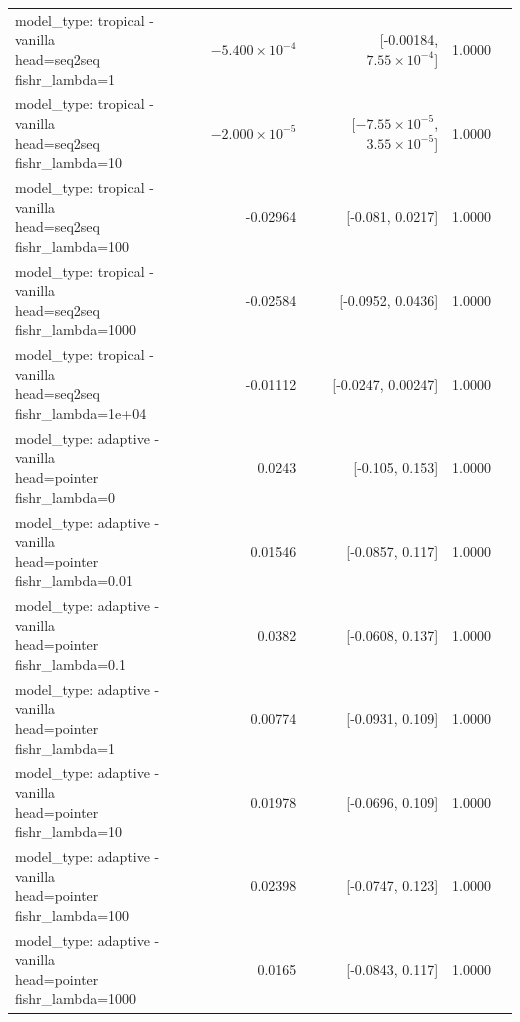 \documentclass[10pt]{article}
\makeatletter
\newcommand{\stackcell}[1]{\begin{tabular}[t]{@{}l@{}}#1\end{tabular}}
\makeatother
\begin{document}
{\begin{longtable}{lrrrl}
\stackcell{model\_type: tropical - vanilla\\\footnotesize head=seq2seq fishr\_lambda=1 } & $-5.400\times10^{-4}$ & [-0.00184, $7.55\times10^{-4}$] & 1.0000 & \\
\stackcell{model\_type: tropical - vanilla\\\footnotesize head=seq2seq fishr\_lambda=10 } & $-2.000\times10^{-5}$ & [$-7.55\times10^{-5}$, $3.55\times10^{-5}$] & 1.0000 & \\
\stackcell{model\_type: tropical - vanilla\\\footnotesize head=seq2seq fishr\_lambda=100 } & -0.02964 & [-0.081, 0.0217] & 1.0000 & \\
\stackcell{model\_type: tropical - vanilla\\\footnotesize head=seq2seq fishr\_lambda=1000 } & -0.02584 & [-0.0952, 0.0436] & 1.0000 & \\
\stackcell{model\_type: tropical - vanilla\\\footnotesize head=seq2seq fishr\_lambda=1e+04 } & -0.01112 & [-0.0247, 0.00247] & 1.0000 & \\
\stackcell{model\_type: adaptive - vanilla\\\footnotesize head=pointer fishr\_lambda=0 } & 0.0243 & [-0.105, 0.153] & 1.0000 & \\
\stackcell{model\_type: adaptive - vanilla\\\footnotesize head=pointer fishr\_lambda=0.01 } & 0.01546 & [-0.0857, 0.117] & 1.0000 & \\
\stackcell{model\_type: adaptive - vanilla\\\footnotesize head=pointer fishr\_lambda=0.1 } & 0.0382 & [-0.0608, 0.137] & 1.0000 & \\
\stackcell{model\_type: adaptive - vanilla\\\footnotesize head=pointer fishr\_lambda=1 } & 0.00774 & [-0.0931, 0.109] & 1.0000 & \\
\stackcell{model\_type: adaptive - vanilla\\\footnotesize head=pointer fishr\_lambda=10 } & 0.01978 & [-0.0696, 0.109] & 1.0000 & \\
\stackcell{model\_type: adaptive - vanilla\\\footnotesize head=pointer fishr\_lambda=100 } & 0.02398 & [-0.0747, 0.123] & 1.0000 & \\
\stackcell{model\_type: adaptive - vanilla\\\footnotesize head=pointer fishr\_lambda=1000 } & 0.0165 & [-0.0843, 0.117] & 1.0000 & \\

\end{longtable}}
\end{document}
